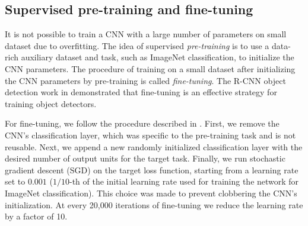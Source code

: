 \subsection{Supervised pre-training and fine-tuning}
\label{sub:fine-train}
It is not possible to train a CNN with a large number of parameters on small dataset due to overfitting. 
The idea of supervised \emph{pre-training} is to use a data-rich auxiliary dataset and task, such as ImageNet classification, to initialize the CNN parameters. The procedure of training on a small dataset after initializing the CNN parameters by pre-training is called \emph{fine-tuning}.
The R-CNN object detection work in \cite{Rcnn} demonstrated that fine-tuning is an effective strategy for training object detectors.


For fine-tuning, we follow the procedure described in \cite{Rcnn}.
First, we remove the CNN's classification layer, which was specific to the pre-training task and is not reusable.
Next, we append a new randomly initialized classification layer with the desired number of output units for the target task.
Finally, we run stochastic gradient descent (SGD) on the target loss function, starting from a learning rate set to $0.001$ ($1/10$-th of the initial learning rate used for training the network for ImageNet classification). 
This choice was made to prevent clobbering the CNN's initialization.
At every 20,000 iterations of fine-tuning we reduce the learning rate by a factor of 10.

